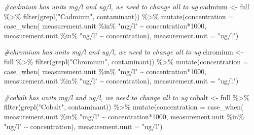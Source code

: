\documentclass[12pt, twoside]{amherstthesis}
\newenvironment{Shaded}{\begin{snugshade}}{\end{snugshade}}
\newcommand{\AttributeTok}[1]{\textcolor[rgb]{0.77,0.63,0.00}{#1}}
\newcommand{\CommentTok}[1]{\textcolor[rgb]{0.56,0.35,0.01}{\textit{#1}}}
\newcommand{\DecValTok}[1]{\textcolor[rgb]{0.00,0.00,0.81}{#1}}
\newcommand{\FunctionTok}[1]{\textcolor[rgb]{0.00,0.00,0.00}{#1}}
\newcommand{\NormalTok}[1]{#1}
\newcommand{\OtherTok}[1]{\textcolor[rgb]{0.56,0.35,0.01}{#1}}
\newcommand{\SpecialCharTok}[1]{\textcolor[rgb]{0.00,0.00,0.00}{#1}}
\newcommand{\StringTok}[1]{\textcolor[rgb]{0.31,0.60,0.02}{#1}}
\begin{document}
\begin{Shaded}
\begin{Highlighting}[]
\CommentTok{\#cadmium has units mg/l and ug/l, we need to change all to ug}
\NormalTok{cadmium }\OtherTok{\textless{}{-}}\NormalTok{ full }\SpecialCharTok{\%\textgreater{}\%}
  \FunctionTok{filter}\NormalTok{(}\FunctionTok{grepl}\NormalTok{(}\StringTok{"Cadmium"}\NormalTok{, contaminant)) }\SpecialCharTok{\%\textgreater{}\%}
  \FunctionTok{mutate}\NormalTok{(}\AttributeTok{concentration =} 
           \FunctionTok{case\_when}\NormalTok{(}
\NormalTok{             measurement.unit }\SpecialCharTok{\%in\%} \StringTok{"mg/l"} \SpecialCharTok{\textasciitilde{}}\NormalTok{ concentration}\SpecialCharTok{*}\DecValTok{1000}\NormalTok{,}
\NormalTok{             measurement.unit }\SpecialCharTok{\%in\%} \StringTok{"ug/l"} \SpecialCharTok{\textasciitilde{}}\NormalTok{ concentration),}
         \AttributeTok{measurement.unit =} \StringTok{"ug/l"}\NormalTok{)}

\CommentTok{\#chromium has units mg/l and ug/l, we need to change all to ug}
\NormalTok{chromium }\OtherTok{\textless{}{-}}\NormalTok{ full }\SpecialCharTok{\%\textgreater{}\%}
  \FunctionTok{filter}\NormalTok{(}\FunctionTok{grepl}\NormalTok{(}\StringTok{"Chromium"}\NormalTok{, contaminant)) }\SpecialCharTok{\%\textgreater{}\%}
  \FunctionTok{mutate}\NormalTok{(}\AttributeTok{concentration =} 
           \FunctionTok{case\_when}\NormalTok{(}
\NormalTok{             measurement.unit }\SpecialCharTok{\%in\%} \StringTok{"mg/l"} \SpecialCharTok{\textasciitilde{}}\NormalTok{ concentration}\SpecialCharTok{*}\DecValTok{1000}\NormalTok{,}
\NormalTok{             measurement.unit }\SpecialCharTok{\%in\%} \StringTok{"ug/l"} \SpecialCharTok{\textasciitilde{}}\NormalTok{ concentration),}
         \AttributeTok{measurement.unit =} \StringTok{"ug/l"}\NormalTok{)}

\CommentTok{\#cobalt has units mg/l and ug/l, we need to change all to ug}
\NormalTok{cobalt }\OtherTok{\textless{}{-}}\NormalTok{ full }\SpecialCharTok{\%\textgreater{}\%}
  \FunctionTok{filter}\NormalTok{(}\FunctionTok{grepl}\NormalTok{(}\StringTok{"Cobalt"}\NormalTok{, contaminant)) }\SpecialCharTok{\%\textgreater{}\%}
  \FunctionTok{mutate}\NormalTok{(}\AttributeTok{concentration =} 
           \FunctionTok{case\_when}\NormalTok{(}
\NormalTok{             measurement.unit }\SpecialCharTok{\%in\%} \StringTok{"mg/l"} \SpecialCharTok{\textasciitilde{}}\NormalTok{ concentration}\SpecialCharTok{*}\DecValTok{1000}\NormalTok{,}
\NormalTok{             measurement.unit }\SpecialCharTok{\%in\%} \StringTok{"ug/l"} \SpecialCharTok{\textasciitilde{}}\NormalTok{ concentration),}
         \AttributeTok{measurement.unit =} \StringTok{"ug/l"}\NormalTok{)}


\end{Highlighting}
\end{Shaded}
\end{document}
